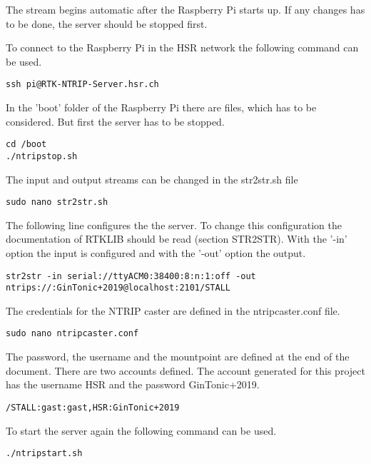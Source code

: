 The stream begins automatic after the Raspberry Pi starts up. If any changes has to be done, the server should be stopped first.

To connect to the Raspberry Pi in the HSR network the following command can be used.

\begin{lstlisting}
ssh pi@RTK-NTRIP-Server.hsr.ch
\end{lstlisting}

In the 'boot' folder of the Raspberry Pi there are files, which has to be considered. But first the server has to be stopped.

\begin{lstlisting}
cd /boot
./ntripstop.sh
\end{lstlisting}

The input and output streams can be changed in the str2str.sh file

\begin{lstlisting}
sudo nano str2str.sh
\end{lstlisting}

The following line configures the the server. To change this configuration the documentation of RTKLIB should be read (section STR2STR). With the '-in' option the input is configured and with the '-out' option the output.

\begin{lstlisting}
str2str -in serial://ttyACM0:38400:8:n:1:off -out ntrips://:GinTonic+2019@localhost:2101/STALL
\end{lstlisting}

The credentials for the NTRIP caster are defined in the ntripcaster.conf file.

\begin{lstlisting}
sudo nano ntripcaster.conf
\end{lstlisting}

The password, the username and the mountpoint are defined at the end of the document. \cite{RTKLIBDoc}
There are two accounts defined. The account generated for this project has the username HSR and the password GinTonic+2019.

\begin{lstlisting}
/STALL:gast:gast,HSR:GinTonic+2019
\end{lstlisting}

To start the server again the following command can be used. \cite{NTRIPMan}

\begin{lstlisting}
./ntripstart.sh
\end{lstlisting}

